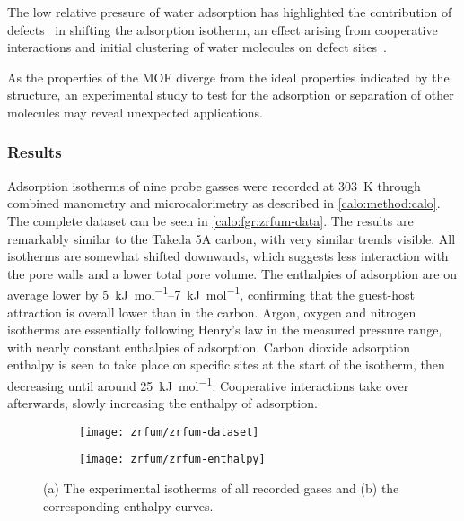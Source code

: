 The low relative pressure of water adsorption has highlighted
the contribution of defects~\cite{choiRoleStructuralDefects2018} in 
shifting the adsorption isotherm, an effect arising from cooperative
interactions and initial clustering of water molecules on defect
sites~\cite{vandichelWaterCoordinationDehydration2016}.

As the properties of the MOF diverge from the ideal properties
indicated by the structure, an experimental study to test for the adsorption
or separation of other molecules may reveal unexpected 
applications.

\subsubsection{Results}

Adsorption isotherms of nine probe gasses were recorded at 
\SI{303}{\kelvin} through combined manometry and microcalorimetry
as described in \autoref{calo:method:calo}. The complete 
dataset can be seen in \autoref{calo:fgr:zrfum-data}.
The results are remarkably similar to the Takeda 5A carbon, with 
very similar trends visible. All isotherms are somewhat 
shifted downwards, which suggests less interaction with the 
pore walls and a lower total pore volume. The enthalpies of 
adsorption are on average lower by \SIrange{5}{7}{\kilo\joule\per\mol},
confirming that the guest-host attraction is overall lower than
in the carbon. Argon, oxygen and nitrogen isotherms are essentially
following Henry's law in the measured pressure range, with nearly constant
enthalpies of adsorption. Carbon dioxide adsorption enthalpy is seen to take
place on specific sites at the start of the isotherm, then
decreasing until around \SI{25}{{\kilo\joule\per\mol}}. Cooperative
interactions take over afterwards, slowly increasing the enthalpy 
of adsorption.

\begin{figure}[htb]
    \centering

	\begin{subfigure}[b]{.45\textwidth}
        \centering
        \texttt{[image: zrfum/zrfum-dataset]}
        \caption{}%
        \label{calo:fgr:zrfum-dataset}
    \end{subfigure}%
	\quad
	\begin{subfigure}[b]{.45\textwidth}
        \centering
        \texttt{[image: zrfum/zrfum-enthalpy]}
        \caption{}%
        \label{calo:fgr:zrfum-enthalpy}
    \end{subfigure}
    \caption{(a) The experimental isotherms of all recorded gases and
    (b) the corresponding enthalpy curves.}%
    \label{calo:fgr:zrfum-data}

\end{figure}

